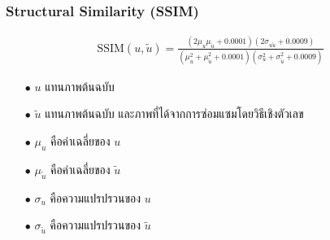 \documentclass[xcolor=dvipsnames, xetex,serif]{beamer}
\begin{document}
    \begin{frame}
        \frametitle{Structural Similarity (SSIM)}
        \begin{align*}
        \text{SSIM}(u,\tilde{u}) = \frac{(2\mu_u\mu_{\tilde{u}} + 0.0001)(2\sigma_{u\tilde{u}} + 0.0009)}{(\mu_u^2+\mu_{\tilde{u}}^2+0.0001)(\sigma_u^2+\sigma_{\tilde{u}}^2+0.0009)}
        \end{align*}
        \begin{itemize}
            \item[$\bullet$] $u$ แทนภาพต้นฉบับ
            \item[$\bullet$] $\tilde{u}$  แทนภาพต้นฉบับ และภาพที่ได้จากการซ่อมแซมโดยวิธีเชิงตัวเลข
            \item[$\bullet$] $\mu_u$ คือค่าเฉลี่ยของ $u$
            \item[$\bullet$] $\mu_{\tilde{u}}$ คือค่าเฉลี่ยของ $\tilde{u}$
            \item[$\bullet$]  $\sigma_u$ คือความแปรปรวนของ $u$ 
            \item[$\bullet$] $\sigma_{\tilde{u}}$ คือความแปรปรวนของ $\tilde{u}$
        \end{itemize}
    \end{frame}
\end{document}
